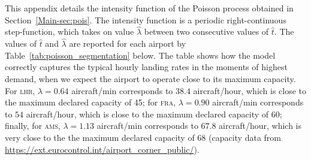 \documentclass[]{elsarticle}
\newcommand{\airp}[1]{\textcolor{#1}{\textsc{#1}}}
\begin{document}
  This appendix details the intensity function of the Poisson process obtained in Section~\ref{Main-sec:pois}.
  The intensity function is a periodic right-continuous step-function, which takes on value \(\hat{\lambda}\) between two consecutive values of \(\hat{t}\).
  The values of \(\hat{t}\) and \(\hat{\lambda}\) are reported for each airport by Table~\ref{tab:poisson_segmentation} below.
  The table shows how the model correctly captures the typical hourly landing rates in the moments of highest demand, when we expect the airport to operate close to its maximum capacity. For \airp{lhr}, \(\lambda = 0.64\) aircraft/min corresponds to \(38.4\) aircraft/hour, which is close to the maximum declared capacity of 45; for \airp{fra}, \(\lambda = 0.90\) aircraft/min corresponds to \(54\) aircraft/hour, which is close to the maximum declared capacity of 60; finally, for \airp{ams}, \(\lambda = 1.13\) aircraft/min corresponds to \(67.8\) aircraft/hour, which is very close to the the maximum declared capacity of 68 (capacity data from \url{https://ext.eurocontrol.int/airport_corner_public/}).
\end{document}
